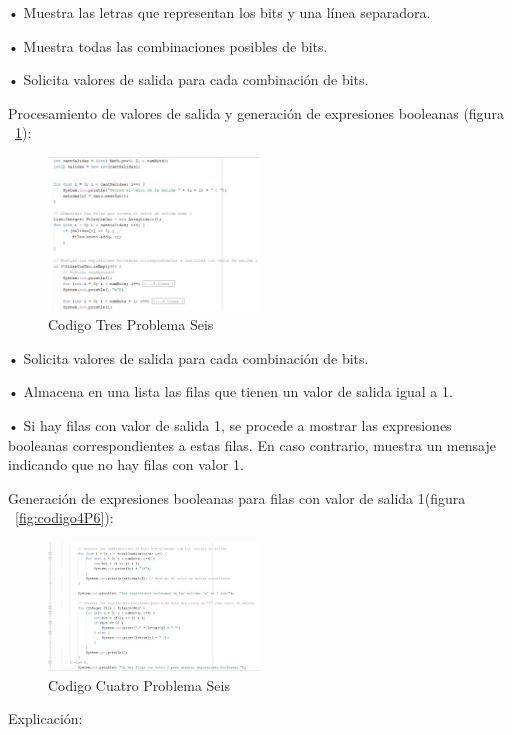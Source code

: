 \documentclass{IEEEcsmag}
\begin{document}
\begin{enumerate}
•	Muestra las letras que representan los bits y una línea separadora.

•	Muestra todas las combinaciones posibles de bits.

•	Solicita valores de salida para cada combinación de bits.

Procesamiento de valores de salida y generación de expresiones booleanas (figura ~\ref{fig:codigo3P6}):
\begin{figure}
\caption{Codigo Tres Problema Seis}
\centerline{\includegraphics[width=0.5\textwidth]{./latex-imagenes/codigo3prob6.jpg}}
\vspace*{7pt}
\label{fig:codigo3P6}
\end{figure}

•	Solicita valores de salida para cada combinación de bits.

•	Almacena en una lista las filas que tienen un valor de salida igual a 1.

•	Si hay filas con valor de salida 1, se procede a mostrar las expresiones booleanas correspondientes a estas filas.
En caso contrario, muestra un mensaje indicando que no hay filas con valor 1.


Generación de expresiones booleanas para filas con valor de salida 1(figura ~\ref{fig:codigo4P6}):
\begin{figure}
\caption{Codigo Cuatro Problema Seis}
\centerline{\includegraphics[width=0.5\textwidth]{./latex-imagenes/codigo4prob6.jpg}}
\vspace*{7pt}
\label{fig:codigoeP6}
\end{figure}
 
Explicación:


\end{enumerate}
\end{document}
